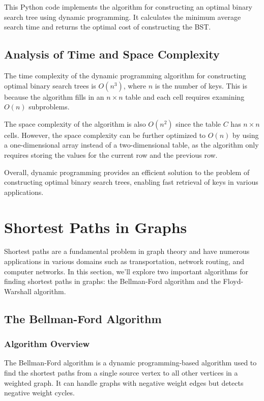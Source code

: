 \documentclass[12pt]{book} %
\begin{document}
\FloatBarrier
This Python code implements the algorithm for constructing an optimal binary search tree using dynamic programming. It calculates the minimum average search time and returns the optimal cost of constructing the BST.

\subsection{Analysis of Time and Space Complexity}

The time complexity of the dynamic programming algorithm for constructing optimal binary search trees is \(O(n^3)\), where \(n\) is the number of keys. This is because the algorithm fills in an \(n \times n\) table and each cell requires examining \(O(n)\) subproblems.

The space complexity of the algorithm is also \(O(n^2)\) since the table \(C\) has \(n \times n\) cells. However, the space complexity can be further optimized to \(O(n)\) by using a one-dimensional array instead of a two-dimensional table, as the algorithm only requires storing the values for the current row and the previous row.

Overall, dynamic programming provides an efficient solution to the problem of constructing optimal binary search trees, enabling fast retrieval of keys in various applications.

\section{Shortest Paths in Graphs}

Shortest paths are a fundamental problem in graph theory and have numerous applications in various domains such as transportation, network routing, and computer networks. In this section, we'll explore two important algorithms for finding shortest paths in graphs: the Bellman-Ford algorithm and the Floyd-Warshall algorithm.

\subsection{The Bellman-Ford Algorithm}

\subsubsection{Algorithm Overview}

The Bellman-Ford algorithm is a dynamic programming-based algorithm used to find the shortest paths from a single source vertex to all other vertices in a weighted graph. It can handle graphs with negative weight edges but detects negative weight cycles.
\end{document}
